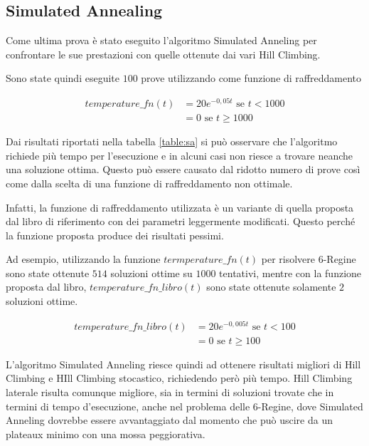\FloatBarrier
\subsection{Simulated Annealing}

Come ultima prova è stato eseguito l'algoritmo Simulated Anneling per confrontare le sue prestazioni con quelle ottenute dai vari Hill Climbing.

Sono state quindi eseguite $100$ prove utilizzando come funzione di raffreddamento

\begin{align*}
temperature\_fn(t) &= 20 e^{-0,05t} \text{ se }  t < 1000 \\
&= 0  \text{ se }  t \geq 1000
\end{align*}

Dai risultati riportati nella tabella \ref{table:sa} si può osservare che l'algoritmo richiede più tempo per l'esecuzione e in alcuni casi non riesce a trovare neanche una soluzione ottima.
Questo può essere causato dal ridotto numero di prove così come dalla scelta di una funzione di raffreddamento non ottimale.

Infatti, la funzione di raffreddamento utilizzata è un variante di quella proposta dal libro di riferimento con dei parametri leggermente modificati. Questo perché la funzione proposta produce dei risultati pessimi.

Ad esempio, utilizzando la funzione $termperature\_fn(t)$ per risolvere $6$-Regine sono state ottenute $514$ soluzioni ottime su $1000$ tentativi, mentre con la funzione proposta 
dal libro, $temperature\_fn\_libro(t)$ sono state ottenute solamente $2$ soluzioni ottime.

\begin{align*}
temperature\_fn\_libro(t) &= 20 e^{-0,005t} \text{ se }  t < 100 \\
&= 0  \text{ se }  t \geq 100
\end{align*}

L'algoritmo Simulated Anneling riesce quindi ad ottenere risultati migliori di Hill Climbing e HIll Climbing stocastico, richiedendo però più tempo. 
Hill Climbing laterale risulta comunque migliore, sia in termini di soluzioni trovate che in termini di tempo d'esecuzione, anche nel problema delle $6$-Regine, dove Simulated Anneling dovrebbe essere avvantaggiato dal momento che può uscire da un plateaux minimo con una mossa peggiorativa.


